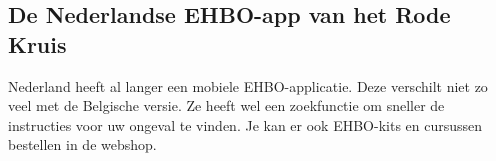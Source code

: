 \subsection{De Nederlandse EHBO-app van het Rode Kruis}
Nederland heeft al langer een mobiele EHBO-applicatie. Deze verschilt niet zo veel met de Belgische versie. Ze heeft wel een zoekfunctie om sneller de instructies voor uw ongeval te vinden. Je kan er ook EHBO-kits en cursussen bestellen in de webshop.